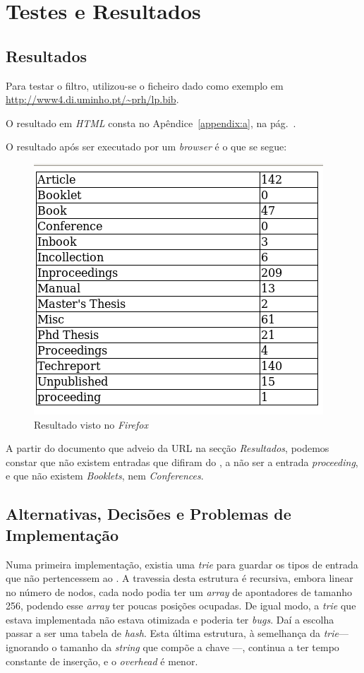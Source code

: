 \section{Testes e Resultados}
\label{sec:ts:a}


\subsection{Resultados}
Para testar o filtro, utilizou-se o ficheiro  dado como exemplo
em \url{http://www4.di.uminho.pt/~prh/lp.bib}.

O resultado em \emph{HTML} consta no Apêndice~\ref{appendix:a}, na
pág.~\pageref{appendix:a}.

O resultado após ser executado por um \emph{browser} é o que se segue:

\begin{figure}[h!]
	\centering
	\includegraphics[scale=0.5]{./testes/res_html}
	\caption{Resultado visto no \emph{Firefox}}
	\label{fig:res1}
\end{figure}

A partir do documento que adveio da URL na secção \emph{Resultados}, podemos
constar que não existem entradas que difiram do , a não ser
a entrada \emph{proceeding}, e que não existem \emph{Booklets}, nem
\emph{Conferences}. 


\subsection{Alternativas, Decisões e Problemas de Implementação}

Numa primeira implementação, existia uma \emph{trie} para guardar os tipos de
entrada que não pertencessem ao . A travessia desta estrutura
é recursiva, embora linear no número de nodos, cada nodo podia ter um
\emph{array} de apontadores de tamanho 256, podendo esse \emph{array} ter poucas
posições ocupadas. De igual modo, a \emph{trie} que estava implementada não
estava otimizada e poderia ter \emph{bugs}. Daí a escolha passar a ser uma
tabela de \emph{hash}. Esta última estrutura, à semelhança da \emph{trie}---
ignorando o tamanho da \emph{string} que compõe a chave ---, continua a ter
tempo constante de inserção, e o \emph{overhead} é menor.

